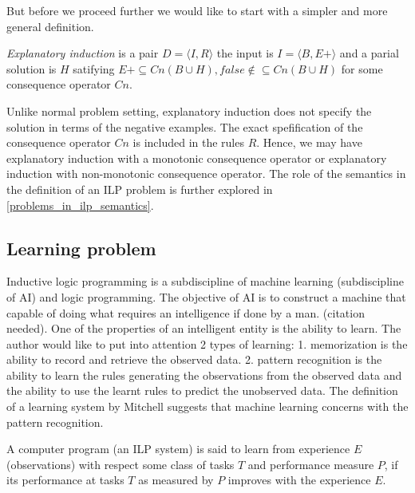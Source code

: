 But before we proceed further we would like to start with a simpler and more general definition.
\begin{defn}
\emph{Explanatory induction}\cite{yamamoto2012inverse} is a pair $D=\langle I, R \rangle$
the input is $I=\langle B, E+ \rangle$ and a parial solution is $H$ satifying
$E+ \subseteq Cn(B \cup H), false \not\in \subseteq Cn(B \cup H)$ for some consequence operator $Cn$.
\end{defn}
Unlike normal problem setting, explanatory induction does not specify the solution in terms of the negative examples. The exact spefification of the consequence operator $Cn$ is included in the rules $R$. Hence, we may have explanatory induction with a monotonic consequence operator or explanatory induction with non-monotonic consequence operator. The role of the semantics in the definition of an ILP problem is further explored in \ref{problems_in_ilp_semantics}.

\subsection{Learning problem}
Inductive logic programming is a subdiscipline of machine learning (subdiscipline of AI) and logic programming. The objective of AI is to construct a machine that capable of doing what requires an intelligence if done by a man. (citation needed). One of the properties of an intelligent entity is the ability to learn. The author would like to put into attention 2 types of learning:
1. memorization is the ability to record and retrieve the observed data.
2. pattern recognition is the ability to learn the rules generating the observations from the observed data and the ability to use the learnt rules to predict the unobserved data. The definition of a learning system by Mitchell suggests that machine learning concerns with the pattern recognition.

\begin{defn}\cite{mitchell1997machine}
A computer program (an ILP system) is said to learn from experience $E$ (observations)
with respect some class of tasks $T$ and performance measure $P$,
if its performance at tasks $T$ as measured by $P$ improves with the experience $E$.
\end{defn}

